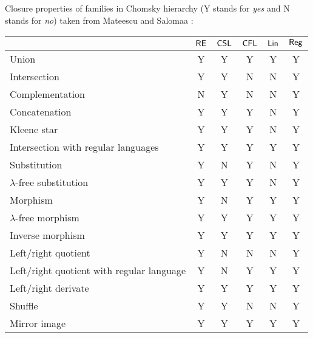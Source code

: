 Closure properties of families in Chomsky hierarchy 
(Y stands for \emph{yes} and N stands for \emph{no}) taken from 
Mateescu and Salomaa \cite{MaSa1997formal}:

\begin{center}
\begin{tabular}{ | l | c | c | c | c | c | }
\hline
              & \index{$\RE$}$\RE$
              & \index{$\CSL$}$\CSL$
              & \index{$\CFL$}$\CFL$ 
              & \index{$\Lin$}$\Lin$ 
              & \index{$\Reg$}$\Reg$\\
\hline
\index{union}Union
              & Y     & Y      & Y      & Y      & Y \\
\hline
\index{intersection}Intersection
              & Y     & Y      & N      & N      & Y \\
\hline
\index{complementation}Complementation
              & N     & Y      & N      & N      & Y \\
\hline
\index{concatenation}Concatenation
              & Y     & Y      & Y      & N      & Y \\
\hline
\index{Kleene star}Kleene star
              & Y     & Y      & Y      & N      & Y \\
\hline
\index{intersection!with regular language}Intersection with regular languages
              & Y     & Y      & Y      & Y      & Y \\
\hline
\index{substitution}Substitution
              & Y     & N      & Y      & N      & Y \\
\hline
\index{substitution!$\lambda$-free}$\lambda$-free substitution  
              & Y     & Y      & Y      & N      & Y \\
\hline
\index{morphism}Morphism
              & Y     & N      & Y      & Y      & Y \\
\hline
\index{morphism!$\lambda$-free}$\lambda$-free morphism
              & Y     & Y      & Y      & Y      & Y \\
\hline
\index{morphism!inverse}Inverse morphism
              & Y     & Y      & Y      & Y      & Y \\
\hline
\index{left-quotient}\index{right-quotient}Left/right quotient
              & Y     & N      & N      & N      & Y \\
\hline
\index{left-quotient!with regular language}\index{right-quotient!with regular 
language}Left/right quotient with regular language
              & Y     & N      & Y      & Y      & Y \\
\hline
\index{left-derivate}\index{right-derivate}Left/right derivate
              & Y     & Y      & Y      & Y      & Y \\
\hline
\index{shuffle}Shuffle
              & Y     & Y      & N      & N      & Y \\
\hline
\index{mirror image}Mirror image
              & Y     & Y      & Y      & Y      & Y \\
\hline
\end{tabular}
\end{center}

